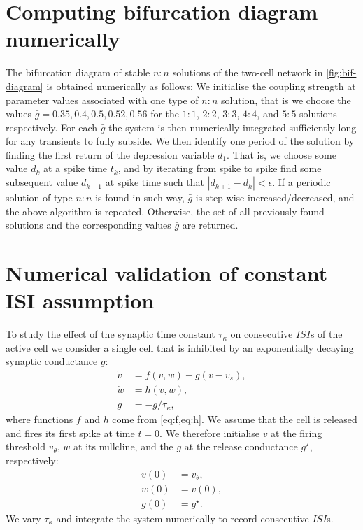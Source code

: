 \documentclass[utf8]{frontiers_suppmat} %
\begin{document}
\section{Computing bifurcation diagram numerically}\label{appendix2}
The bifurcation diagram of stable $n:n$ solutions of the two-cell network in \cref{fig:bif-diagram} is obtained numerically as follows:
We initialise the coupling strength at parameter values associated with one type of $n:n$ solution, that is we choose the values $\bar g = 0.35, 0.4, 0.5, 0.52, 0.56$ for the $1:1$, $2:2$, $3:3$, $4:4$, and $5:5$ solutions respectively.
For each $\bar g$ the system is then numerically integrated sufficiently long for any transients to fully subside.
We then identify one period of the solution by finding the first return of the depression variable $d_{1}$.
That is, we choose some value $d_{k}$ at a spike time $t_{k}$, and by iterating from spike to spike find some subsequent value $d_{k+1}$ at spike time such that $|d_{k+1}-d_{k}|<\epsilon$.
If a periodic solution of type $n:n$ is found in such way, $\bar g$ is step-wise increased/decreased, and the above algorithm is repeated.
Otherwise, the set of all previously found solutions and the corresponding values $\bar g$ are returned.

\section{Numerical validation of constant ISI assumption}
\label{sec:tauk}
To study the effect of the synaptic time constant $\tau_\kappa$ on consecutive $ISI$s of the active cell we consider a single cell that is inhibited by an exponentially decaying synaptic conductance $g$:
\begin{align}
	\label{eq:dotv}
	\dot v & = f(v, w) - g(v - v_{s}), \\
	\label{eq:dotw}
	\dot w & =h(v, w),                 \\
	\label{eq:dotg}
	\dot g & = -g/\tau_{\kappa},
\end{align}
where functions $f$ and $h$ come from \cref{eq:f,eq:h}.
We assume that the cell is released and fires its first spike at time $t=0$.
We therefore initialise $v$ at the firing threshold $v_{\theta}$, $w$ at its nullcline, and
the $g$ at the release conductance $g^{\star}$, respectively:
\begin{align}
	v(0) & = v_{\theta}, \\
	w(0) & = v(0),       \\
	g(0) & = g^{\star}.
\end{align}
We vary $\tau_{\kappa}$ and integrate the system numerically to record consecutive $ISI$s.
\end{document}
